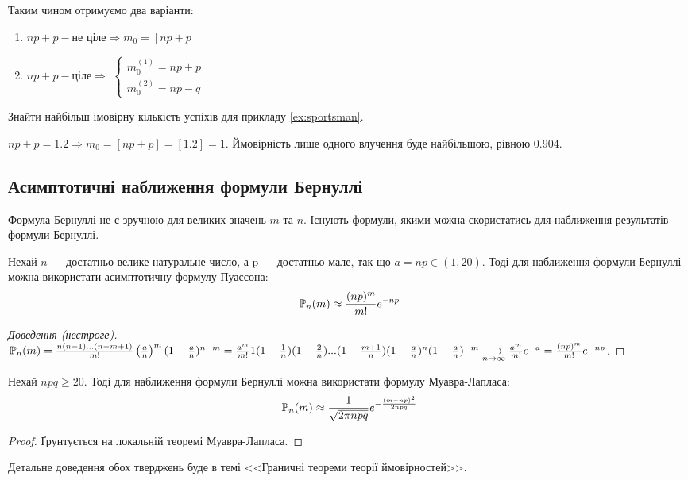 Таким чином отримуємо два варіанти:
\begin{enumerate}
    \item $np+p - \text{не ціле} \Rightarrow m_0 = \left[np+p\right]$
    \item $np+p - \text{ціле} \Rightarrow $
    $
    \begin{cases}
        m_0^{(1)} = np+p \\
        m_0^{(2)} = np-q
    \end{cases}
    $
\end{enumerate}

\begin{example}
    Знайти найбільш імовірну кількість успіхів для прикладу \eqref{ex:sportsman}.

    $np + p = 1.2 \Rightarrow m_0 = \left[np + p\right] = \left[1.2\right] = 1$.
    Ймовірність лише одного влучення буде найбільшою, рівною $0.904$.
\end{example}

\subsection{Асимптотичні наближення формули Бернуллі}
Формула Бернуллі не є зручною для великих значень $m$ та $n$. Існують формули, якими можна 
скористатись для наближення результатів формули Бернуллі.
\begin{proposition}
    Нехай $n$ --- достатньо велике натуральне число, а p --- достатньо мале, так що 
    $a = np \in (1, 20)$. Тоді для наближення формули Бернуллі можна використати 
    асимптотичну формулу Пуассона:
    $$\P_n(m) \approx \frac{(np)^m}{m!}e^{-np}$$
\end{proposition}
\begin{proof}[Доведення (нестроге)]
    $\P_n(m) = \frac{n(n-1)...(n-m+1)}{m!} \left(\frac{a}{n}\right)^m 
    (1-\frac{a}{n})^{n-m} = \frac{a^m}{m!} 1(1 - \frac{1}{n})(1 - \frac{2}{n})
    ...(1 - \frac{m+1}{n})(1-\frac{a}{n})^n (1-\frac{a}{n})^{-m} 
    \underset{n \rightarrow \infty}{\longrightarrow} \frac{a^m}{m!}e^{-a} = \frac{(np)^m}{m!}e^{-np}$.
\end{proof}
\begin{proposition}
    Нехай $npq \geq 20$. Тоді для наближення формули Бернуллі можна використати 
    формулу Муавра-Лапласа:
    $$\P_n(m) \approx \frac{1}{\sqrt{2\pi npq}} e^{-\frac{(m-np)^2}{2npq}}$$
\end{proposition}
\begin{proof}
    Ґрунтується на локальній теоремі Муавра-Лапласа.
\end{proof}
Детальне доведення обох тверджень буде в темі <<Граничні теореми теорії ймовірностей>>.